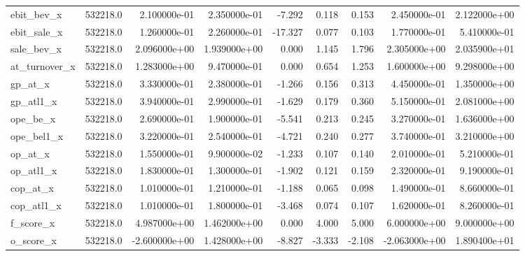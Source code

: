\documentclass[12pt]{article}
\begin{document}
\begin{landscape}
\begin{longtable}{|l|r|r|r|r|r|r|r|r|}
ebit\_bev\_x             &  532218.0 &  2.100000e-01 &  2.350000e-01 &      -7.292 &        0.118 &        0.153 &  2.450000e-01 &  2.122000e+00 \\
ebit\_sale\_x            &  532218.0 &  1.260000e-01 &  2.260000e-01 &     -17.327 &        0.077 &        0.103 &  1.770000e-01 &  5.410000e-01 \\
sale\_bev\_x             &  532218.0 &  2.096000e+00 &  1.939000e+00 &       0.000 &        1.145 &        1.796 &  2.305000e+00 &  2.035900e+01 \\
at\_turnover\_x          &  532218.0 &  1.283000e+00 &  9.470000e-01 &       0.000 &        0.654 &        1.253 &  1.600000e+00 &  9.298000e+00 \\
gp\_at\_x                &  532218.0 &  3.330000e-01 &  2.380000e-01 &      -1.266 &        0.156 &        0.313 &  4.450000e-01 &  1.350000e+00 \\
gp\_atl1\_x              &  532218.0 &  3.940000e-01 &  2.990000e-01 &      -1.629 &        0.179 &        0.360 &  5.150000e-01 &  2.081000e+00 \\
ope\_be\_x               &  532218.0 &  2.690000e-01 &  1.900000e-01 &      -5.541 &        0.213 &        0.245 &  3.270000e-01 &  1.636000e+00 \\
ope\_bel1\_x             &  532218.0 &  3.220000e-01 &  2.540000e-01 &      -4.721 &        0.240 &        0.277 &  3.740000e-01 &  3.210000e+00 \\
op\_at\_x                &  532218.0 &  1.550000e-01 &  9.900000e-02 &      -1.233 &        0.107 &        0.140 &  2.010000e-01 &  5.210000e-01 \\
op\_atl1\_x              &  532218.0 &  1.830000e-01 &  1.300000e-01 &      -1.902 &        0.121 &        0.159 &  2.320000e-01 &  9.190000e-01 \\
cop\_at\_x               &  532218.0 &  1.010000e-01 &  1.210000e-01 &      -1.188 &        0.065 &        0.098 &  1.490000e-01 &  8.660000e-01 \\
cop\_atl1\_x             &  532218.0 &  1.010000e-01 &  1.800000e-01 &      -3.468 &        0.074 &        0.107 &  1.620000e-01 &  8.260000e-01 \\
f\_score\_x              &  532218.0 &  4.987000e+00 &  1.462000e+00 &       0.000 &        4.000 &        5.000 &  6.000000e+00 &  9.000000e+00 \\
o\_score\_x              &  532218.0 & -2.600000e+00 &  1.428000e+00 &      -8.827 &       -3.333 &       -2.108 & -2.063000e+00 &  1.890400e+01 \\

\end{longtable}
\end{landscape}
\end{document}
